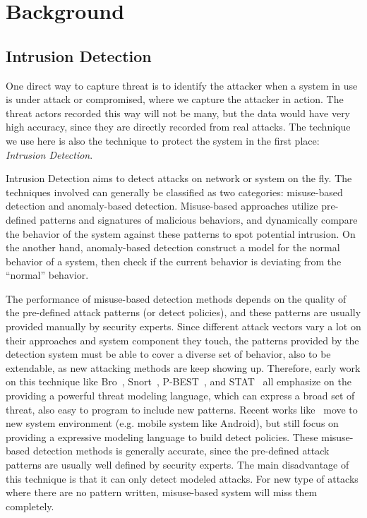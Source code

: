 \chapter{Background}
\section{Intrusion Detection}

One direct way to capture threat is to identify the attacker when a 
system in use is under attack or compromised, where we capture the 
attacker in action. The threat actors recorded this way will not be 
many, but the data would have very high accuracy, since they are
directly recorded from real attacks. The technique we use here is also 
the technique to protect the system in the first place:
\textit{Intrusion Detection}.

Intrusion Detection aims to detect attacks on network or system on the
fly. The techniques involved can generally be classified as two 
categories: misuse-based detection and anomaly-based detection.
Misuse-based approaches utilize pre-defined patterns and signatures
of malicious behaviors, and dynamically compare the behavior of the
system against these patterns to spot potential intrusion. On the another
hand, anomaly-based detection construct a model for the normal behavior 
of a system, then check if the current behavior is deviating from the 
``normal'' behavior.

The performance of misuse-based detection methods depends on the quality
of the pre-defined attack patterns (or detect policies), and these 
patterns are usually provided manually by security experts. Since 
different attack vectors vary a lot on their approaches and system 
component they touch, the 
patterns provided by the detection system must be able to cover a 
diverse set of behavior, also to be extendable, as new attacking
methods are keep showing up. Therefore, early work on this technique like
Bro~\cite{paxson1999bro}, Snort~\cite{roesch1999snort}, 
P-BEST~\cite{lindqvist1999detecting}, and STAT~\cite{vigna2003designing}
all emphasize on the providing a powerful threat modeling language, which
can express a broad set of threat, also easy to program to include new 
patterns. Recent works like~\cite{bugiel2012towards} move to new
system environment (e.g. mobile system like Android), but still focus
on providing a expressive modeling language to build detect policies. 
These misuse-based detection methods is generally accurate, since the
pre-defined attack patterns are usually well defined by security experts. 
The main disadvantage of this technique is that it can only detect 
modeled attacks. For new type of attacks where there are no pattern
written, misuse-based system will miss them completely.

